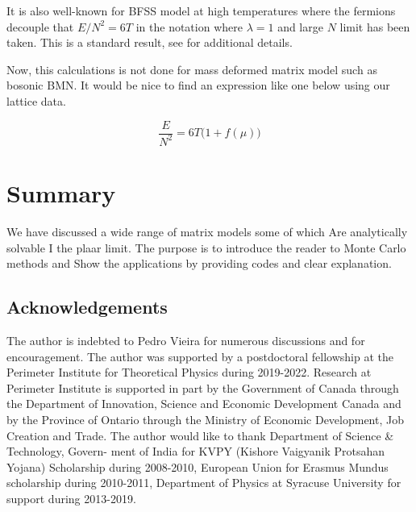 \documentclass[11pt]{article}
\begin{document}
It is also well-known for BFSS model at high temperatures where the fermions decouple that $ E/N^2 = 6T$ in the notation where $\lambda=1$ and large $N$ limit has been taken. This is a standard result, see \cite{Kawahara:2007ib} for additional details. 

Now, this calculations is not done for mass deformed matrix model such as bosonic BMN. It would be nice to find an expression like one below using our lattice data.

\begin{equation}
\frac{E}{N^2} = 6T \Bigg( 1 + f(\mu) \Bigg)
\end{equation}



\section{Summary}

We have discussed a wide range of matrix models some of which
Are analytically solvable I the plaar limit. 
The purpose is to introduce the reader to Monte Carlo methods and
Show the applications by providing codes and clear explanation. 


\subsection*{Acknowledgements}
The author is indebted to Pedro Vieira
for numerous discussions and for encouragement. 
The author was supported by a postdoctoral fellowship at the Perimeter Institute for 
Theoretical Physics during 2019-2022. Research at Perimeter Institute is supported 
in part by the Government of Canada through the Department of Innovation, Science and 
Economic Development Canada and by the Province of Ontario through 
the Ministry of Economic Development, Job Creation and Trade.
The author would like to thank Department of Science \& Technology, Govern-
ment of India for KVPY (Kishore Vaigyanik Protsahan Yojana) Scholarship during 2008-2010, 
European Union for Erasmus Mundus scholarship during 2010-2011, 
Department of Physics at Syracuse University for support during 2013-2019. 

\newpage 
\appendix


\end{document}
